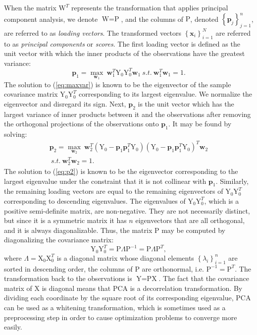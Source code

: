 When the matrix $\text{W}^T$ represents the transformation that applies principal component analysis, we denote $\text{W}=\text{P}$, and the columns of $\text{P}$, denoted $\left\{ \textbf{p}_j \right\}_{j=1}^n$, are referred to as \emph{loading vectors}. The transformed vectors $\left\{ \textbf{x}_i \right\}_{i=1}^N$ are referred to as \emph{principal components} or \emph{scores}. The first loading vector is defined as the unit vector with which the inner products of the observations have the greatest variance: 
\begin{equation}
\textbf{p}_1 = \underset{\textbf{w}_1}{\max}{~\textbf{w}_1^T \text{Y}_0 \text{Y}_0^T \textbf{w}_1 }~s.t.~\textbf{w}_1^T \textbf{w}_1 = 1.
\label{eq:maxvar}
\end{equation}
The solution to (\ref{eq:maxvar}) is known to be the eigenvector of the sample covariance matrix $\text{Y}_0 \text{Y}_0^T$ corresponding to its largest eigenvalue. We normalize the eigenvector and disregard its sign. Next, $\textbf{p}_2$ is the unit vector which has the largest variance of inner products between it and the observations after removing the orthogonal projections of the observations onto $\textbf{p}_1$. It may be found by solving:
\begin{multline}
\textbf{p}_2 = \underset{\textbf{w}_2}{\max}{~\textbf{w}_2^T \left( \text{Y}_0 - \textbf{p}_1 \textbf{p}_1^T \text{Y}_0 \right) \left( \text{Y}_0 - \textbf{p}_1 \textbf{p}_1^T \text{Y}_0 \right)^T \textbf{w}_2 }\\~s.t.~ \textbf{w}_2^T \textbf{w}_2 = 1.
\label{eq:p2}
\end{multline}
The solution to (\ref{eq:p2}) is known to be the eigenvector corresponding to the largest eigenvalue under the constraint that it is not collinear with $\textbf{p}_1$. Similarly, the remaining loading vectors are equal to the remaining eigenvectors of $\text{Y}_0 \text{Y}_0^T$ corresponding to descending eigenvalues. The eigenvalues of $\text{Y}_0 \text{Y}_0^T$, which is a positive semi-definite matrix, are non-negative. They are not necessarily distinct, but since it is a symmetric matrix it has $n$ eigenvectors that are all orthogonal, and it is always diagonalizable. Thus, the matrix $\text{P}$ may be computed by diagonalizing the covariance matrix:
\[
\text{Y}_0 \text{Y}_0^T = \text{P} \Lambda \text{P}^{-1} = \text{P} \Lambda \text{P}^T,
\]
where $\Lambda = \text{X}_0 \text{X}_0^T$ is a diagonal matrix whose diagonal elements $\left\{ \lambda_i \right\}_{i=1}^n$ are sorted in descending order, the columns of $\text{P}$ are orthonormal, i.e. $\text{P}^{-1}=\text{P}^T$. The transformation back to the observations is $\text{Y} = \text{P} \text{X}$. The fact that the covariance matrix of $\text{X}$ is diagonal means that PCA is a decorrelation transformation. By dividing each coordinate by the square root of its corresponding eigenvalue, PCA can be used as a whitening transformation, which is sometimes used as a preprocessing step in order to cause optimization problems to converge more easily.


